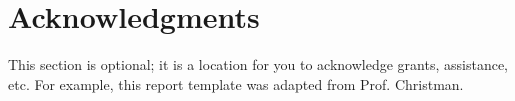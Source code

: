 \section{Acknowledgments}

This section is optional; it is a location for you to acknowledge grants,
assistance, etc. For example, this report template was adapted from Prof.
Christman.

